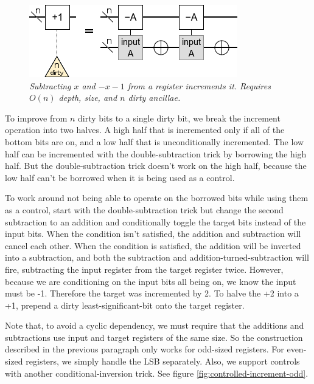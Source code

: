 \documentclass[twocolumn]{article}
\begin{document}
\begin{figure}
  \centering
  \includegraphics[width=\linewidth]{assets/increment-many-dirty.png}
  \caption{\em Subtracting $x$ and $-x-1$ from a register increments it. Requires $O(n)$ depth, size, and $n$ dirty ancillae.}
  \label{fig:increment-many-dirty}
\end{figure}

To improve from $n$ dirty bits to a single dirty bit, we break the increment operation into two halves.
A high half that is incremented only if all of the bottom bits are on, and a low half that is unconditionally incremented.
The low half can be incremented with the double-subtraction trick by borrowing the high half.
But the double-subtraction trick doesn't work on the high half, because the low half can't be borrowed when it is being used as a control.

To work around not being able to operate on the borrowed bits while using them as a control, start with the double-subtraction trick but change the second subtraction to an addition and conditionally toggle the target bits instead of the input bits.
When the condition isn't satisfied, the addition and subtraction will cancel each other.
When the condition is satisfied, the addition will be inverted into a subtraction, and both the subtraction and addition-turned-subtraction will fire, subtracting the input register from the target register twice.
However, because we are conditioning on the input bits all being on, we know the input must be -1.
Therefore the target was incremented by 2.
To halve the +2 into a +1, prepend a dirty least-significant-bit onto the target register.

Note that, to avoid a cyclic dependency, we must require that the additions and subtractions use input and target registers of the same size.
So the construction described in the previous paragraph only works for odd-sized registers.
For even-sized registers, we simply handle the LSB separately.
Also, we support controls with another conditional-inversion trick.
See figure \ref{fig:controlled-increment-odd}.
\end{document}
